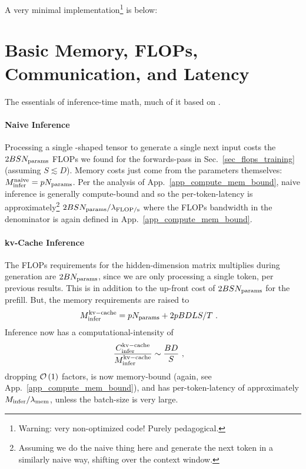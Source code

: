 \documentclass[11pt]{article}
\begin{document}
A very minimal implementation\footnote{Warning: very non-optimized code! Purely pedagogical.} is below:


\section{Basic Memory, FLOPs, Communication, and Latency}

The essentials of inference-time math, much of it based on \cite{kipply_inference_math}.

\paragraph{Naive Inference} Processing a single -shaped tensor to generate a
single next input costs the $ 2BSN _{ {\rm params}  } $ FLOPs we found for the forwards-pass in
Sec.~\ref{sec_flops_training} (assuming $ S \lesssim D $). Memory costs just come from the parameters
themselves: $ M _{ {\rm infer}  }^{ {\rm naive}  }=pN _{ {\rm params}  } $. Per the analysis of
App.~\ref{app_compute_mem_bound}, naive inference is generally compute-bound and so the
per-token-latency is approximately\footnote{Assuming we do the naive thing here and generate the
    next token in a similarly naive way, shifting over the context window.}  $  2BSN _{ {\rm params}
    }/ \lambda _{ {\rm FLOP/s}  } $ where the FLOPs bandwidth in the denominator is again defined in
    App.~\ref{app_compute_mem_bound}.

\paragraph{kv-Cache Inference}
The FLOPs requirements for the hidden-dimension matrix multiplies during generation are $2BN _{ {\rm params}  } $,
since we are only processing a single token, per previous results.   This is in addition to the up-front cost of $ 2BSN _{
			{\rm params}} $ for the prefill. But, the memory requirements are raised to
\begin{align}
	M _{ {\rm infer}  }^{ {\rm kv-cache}  } & =pN _{ {\rm params}  } + 2pBDLS/T\ .
\end{align}
Inference now has a computational-intensity of
\begin{align}
	\frac{ C _{ {\rm infer} } ^{ {\rm kv-cache} } }{ M _{ {\rm infer}  }^{ {\rm kv-cache}  } } & \sim \frac{ BD }{ S } \ ,
\end{align}
dropping $ \mathcal{O} \left( 1 \right)  $ factors, is now memory-bound (again, see
App.~\ref{app_compute_mem_bound}), and has per-token-latency of approximately $ M _{ {\rm infer} }/
	\lambda _{ {\rm mem} }$, unless the batch-size is very large.
\end{document}
